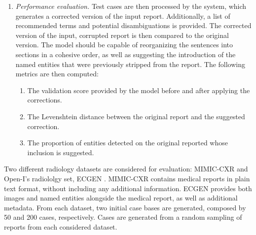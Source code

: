\begin{enumerate}
    \item \textit{Performance evaluation.} Test cases are then processed by the system, which generates a corrected version of the input report. Additionally, a list of recommended terms and potential disambiguations is provided. The corrected version of the input, corrupted report is then compared to the original version. The model should be capable of reorganizing the sentences into sections in a cohesive order, as well as suggesting the introduction of the named entities that were previously stripped from the report. The following metrics are then computed:
    \begin{enumerate}
        \item The validation score provided by the model before and after applying the corrections.
        \item The Levenshtein distance between the original report and the suggested correction.
        \item The proportion of entities detected on the original reported whose inclusion is suggested.
    \end{enumerate}
\end{enumerate}


Two different radiology datasets are considered for evaluation: MIMIC-CXR \citep{mimic-cxr} and Open-I's radiololgy set, ECGEN \citep{openi}. MIMIC-CXR contains medical reports in plain text format, without including any additional information. ECGEN provides both images and named entities alongside the medical report, as well as additional metadata. From each dataset, two initial case bases are generated, composed by 50 and 200 cases, respectively. Cases are generated from a random sampling of reports from each considered dataset. 

